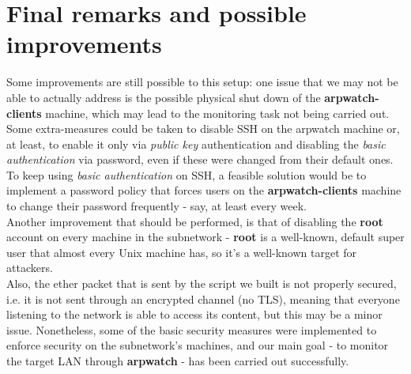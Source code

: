 \section{Final remarks and possible improvements}
Some improvements are still possible to this setup: one issue that we may not be able to actually address is the possible physical shut down of the \textbf{arpwatch-clients} machine, which may lead to the monitoring task not being carried out.\\
Some extra-measures could be taken to disable SSH on the arpwatch machine or, at least, to enable it only via \textit{public key} authentication and disabling the \textit{basic authentication} via password, even if these were changed from their default ones. To keep using \textit{basic authentication} on SSH, a feasible solution would be to implement a password policy that forces users on the \textbf{arpwatch-clients} machine to change their password frequently - say, at least every week.\\
Another improvement that should be performed, is that of disabling the \textbf{root} account on every machine in the subnetwork - \textbf{root} is a well-known, default super user that almost every Unix machine has, so it's a well-known target for attackers.\\
Also, the ether packet that is sent by the script we built is not properly secured, i.e. it is not sent through an encrypted channel (no TLS), meaning that everyone listening to the network is able to access its content, but this may be a minor issue.
Nonetheless, some of the basic security measures were implemented to enforce security on the subnetwork's machines, and our main goal - to monitor the target LAN through \textbf{arpwatch} - has been carried out successfully.
